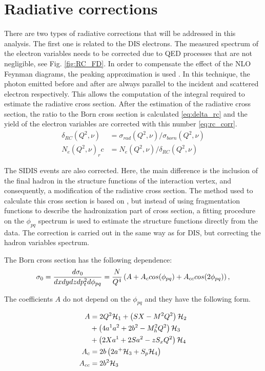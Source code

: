 \section{Radiative corrections} 
There are two types of radiative corrections that will be addressed in this analysis. The first one is related to the DIS electrons. The measured spectrum of the electron variables needs to be corrected due to QED processes that are not negligible, see Fig. \ref{fig:RC_FD}. In order to compensate the effect of the NLO Feynman diagrams, the peaking approximation is used \cite{Mo:1968cg}. In this technique, the photon emitted before and after are always parallel to the incident and scattered electron respectively. This allows the computation of the integral required to estimate the radiative cross section.
After the estimation of the radiative cross section, the ratio to the Born cross section is calculated \eqref{eq:delta_rc} and the yield of the electron variables are corrected with this number \eqref{eq:rc_corr}.
\begin{align}
\delta_{RC}(Q^2,\nu)&=\sigma_{rad}(Q^2,\nu)/\sigma_{born}(Q^2,\nu) \label{eq:delta_rc}\\
N_e(Q^2,\nu)_rc &= N_e(Q^2,\nu)/\delta_{RC}(Q^2,\nu)\label{eq:rc_corr}
\end{align}

The SIDIS events are also corrected. Here, the main difference is the inclusion of the final hadron in the structure functions of the interaction vertex, and consequently, a modification of the radiative cross section. The method used to calculate this cross section is based on \cite{Akushevich1999}, but instead of using fragmentation functions to describe the hadronization part of cross section, a fitting procedure on the $\phi_{pq}$ spectrum is used to estimate the structure functions directly from the data. The correction is carried out in the same way as for DIS, but correcting the hadron variables spectrum.

The Born cross section has the following dependence:
\begin{equation}
\sigma_0=\frac{d\sigma_0}{dxdydzdp_t^2d\phi_{pq}}=\frac{N}{Q^4}\left( A+A_{c}cos(\phi_{pq}) + A_{cc}cos(2\phi_{pq}) \right),
\label{eq:born_xs}
\end{equation}

The coefficients $A$ do not depend on the $\phi_{pq}$ and they have the following form.

\begin{align}
A&=2Q^2\mathcal{H}_1 + \left( SX - M^2Q^2 \right)\mathcal{H}_2 \nonumber \\
&+ \left( 4a^1a^2 + 2b^2 - M_h^2Q^2 \right)\mathcal{H}_3 \nonumber \\
&+ \left( 2Xa^1+2Sa^2 - zS_xQ^2 \right)\mathcal{H}_4 \nonumber\\
A_c &= 2b\left( 2a^+\mathcal{H}_3 + S_p\mathcal{H}_4 \right) \nonumber\\
A_{cc} &= 2b^2 \mathcal{H}_3 \label{eq:A}
\end{align}

